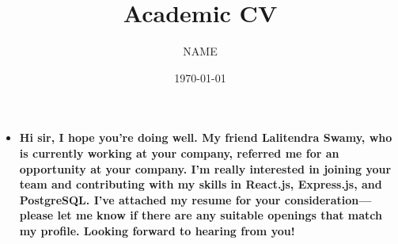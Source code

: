 \documentclass{article}
\title{Academic CV}
\author{{{NAME}}}
\date{\today}
\begin{document}
\maketitle

\begin{itemize}
\item \textbf{Hi sir, I hope you're doing well. My friend Lalitendra Swamy, who is currently working at your company, referred me for an opportunity at your company. I'm really interested in joining your team and contributing with my skills in React.js, Express.js, and PostgreSQL. I've attached my resume for your consideration—please let me know if there are any suitable openings that match my profile. Looking forward to hearing from you!}


\end{itemize}
\end{document}
